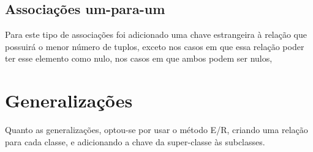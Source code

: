 \documentclass[article, a4paper, 12pt, oneside]{memoir}
\begin{document}
\subsection{Associações um-para-um}
Para este tipo de associações foi adicionado uma chave estrangeira à relação que possuirá o menor número de tuplos, exceto nos casos em que essa relação poder ter esse elemento como nulo, nos casos em que ambos podem ser nulos, 

\section{Generalizações}
Quanto as generalizações, optou-se por usar o método E/R, criando uma relação para cada classe, e adicionando a chave da super-classe às subclasses.
\end{document}
